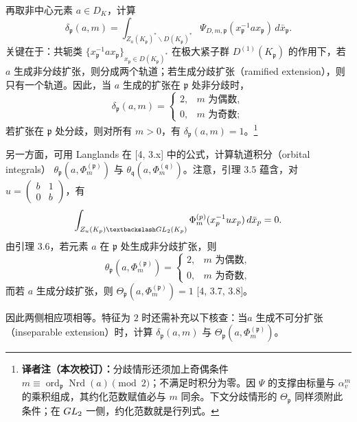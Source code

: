 再取非中心元素 $a\in D_K$，计算
\[
\delta_{\mathfrak p}(a,m)=
\int_{Z_a(K_{\mathfrak p})^*\backslash D(K_{\mathfrak p})^*}
\Psi_{D,m,\mathfrak p}(x_{\mathfrak p}^{-1}ax_{\mathfrak p})\,d\bar x_{\mathfrak p}.
\]
关键在于：共轭类
$\{x_{\mathfrak p}^{-1}ax_{\mathfrak p}\}_{x_{\mathfrak p}\in D(K_{\mathfrak p})^*}$
在极大紧子群 $D^{(1)}(K_{\mathfrak p})$ 的作用下，若 $a$ 生成非分歧扩张，则分成两个轨道；若生成分歧扩张（ramified extension），则只有一个轨道。因此，当 $a$ 生成的扩张在 $\mathfrak p$ 处非分歧时，
\[
\delta_{\mathfrak p}(a,m)=\begin{cases}2,&m\text{ 为偶数},\\0,&m\text{ 为奇数};\end{cases}
\]
若扩张在 $\mathfrak p$ 处分歧，则对所有 $m>0$，有
$\delta_{\mathfrak p}(a,m)=1$。\footnote{\textbf{译者注（本次校订）：}分歧情形还须加上奇偶条件 $m\equiv\operatorname{ord}_{\mathfrak p}\operatorname{Nrd}(a)\pmod2$；不满足时积分为零。因 $\Psi$ 的支撑由标量与 $\alpha_v^m$ 的乘积组成，其约化范数赋值必与 $m$ 同余。下文分歧情形的 $\Theta_{\mathfrak p}$ 同样须附此条件；在 $GL_2$ 一侧，约化范数就是行列式。}

另一方面，可用 Langlands 在 [4, 3.x] 中的公式，计算轨道积分（orbital integrals）
$\theta_{\mathfrak p}(a,\Phi_m^{(\mathfrak p)})$ 与
$\theta_{\mathfrak q}(a,\Phi_m^{(\mathfrak q)})$。注意，引理 3.5 蕴含，对
$u=\begin{pmatrix}b&1\\0&b\end{pmatrix}$，有
\[
\int_{Z_u(K_{\mathfrak p})\backslash\GL_2(K_{\mathfrak p})}
\Phi_m^{(\mathfrak p)}(x_{\mathfrak p}^{-1}ux_{\mathfrak p})\,d\bar x_{\mathfrak p}=0.
\]
由引理 3.6，若元素 $a$ 在 $\mathfrak p$ 处生成非分歧扩张，则
\[
\theta_{\mathfrak p}(a,\Phi_m^{(\mathfrak p)})
=\begin{cases}2,&m\text{ 为偶数},\\0,&m\text{ 为奇数},\end{cases}
\]
而若 $a$ 生成分歧扩张，则 $\Theta_{\mathfrak p}(a,\Phi_m^{(\mathfrak p)})=1$ [4, 3.7, 3.8]。

因此两侧相应项相等。特征为 $2$ 时还需补充以下核查：当$a$ 生成不可分扩张（inseparable extension）时，计算
$\delta_{\mathfrak p}(a,m)$ 与 $\Theta_{\mathfrak p}(a,\Phi_m^{(\mathfrak p)})$。

